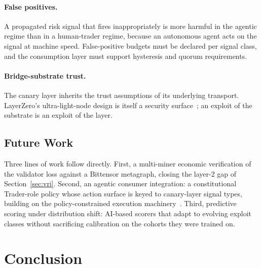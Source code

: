 \documentclass[journal]{IEEEtran}
\begin{document}
\paragraph*{False positives.}
A propagated risk signal that fires inappropriately is more harmful in
the agentic regime than in a human-trader regime, because an
autonomous agent acts on the signal at machine speed. False-positive
budgets must be declared per signal class, and the consumption layer
must support hysteresis and quorum requirements.

\paragraph*{Bridge-substrate trust.}
The canary layer inherits the trust assumptions of its underlying
transport. LayerZero's ultra-light-node design is itself a security
surface~\cite{ZhangZZL24,LiQXZZWX25,augusto2024sok}; an exploit of the
substrate is an exploit of the layer.

\subsection{Future Work}

Three lines of work follow directly. First, a multi-miner economic
verification of the validator loss against a Bittensor metagraph,
closing the layer-2 gap of Section~\ref{sec:vri}. Second, an
agentic consumer integration: a constitutional Trader-role policy
whose action surface is keyed to canary-layer signal types, building
on the policy-constrained execution
machinery~\cite{omnirisk2026agentic}. Third, predictive scoring under
distribution shift: AI-based scorers that adapt to evolving exploit
classes without sacrificing calibration on the cohorts they were
trained on.

\section{Conclusion}\label{sec:concl}
\end{document}
